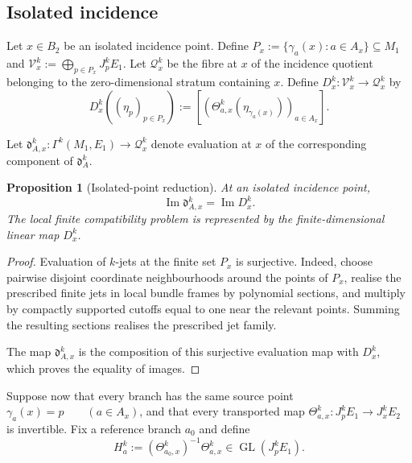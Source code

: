 \documentclass[11pt]{article}
\theoremstyle{plain}
\newtheorem{proposition}[theorem]{Proposition}
\theoremstyle{definition}
\begin{document}
\subsection{Isolated incidence}
\label{subsec:isolated-incidence}

Let \(x\in B_2\) be an isolated incidence point. Define \(P_x := \{\gamma_a(x):a\in A_x\} \subseteq M_1\) and
\(\mathcal V_x^k := \bigoplus_{p\in P_x}J_p^kE_1\).
Let \(\mathcal Q_x^k\) be the fibre at \(x\) of the incidence quotient belonging to the
zero-dimensional stratum containing \(x\). Define \(D_x^k: \mathcal V_x^k \longrightarrow \mathcal Q_x^k\) by
\[
  D_x^k
  \left(
    (\eta_p)_{p\in P_x}
  \right)
  :=
  \left[
    \left(
      \Theta_{a,x}^k
      \left(
        \eta_{\gamma_a(x)}
      \right)
    \right)_{a\in A_x}
  \right].
\]

Let \(\mathfrak d_{A,x}^k: \Gamma^k(M_1,E_1) \longrightarrow \mathcal Q_x^k\) denote evaluation at \(x\) of the corresponding component of
\(\mathfrak d_A^k\).

\begin{proposition}[Isolated-point reduction]
\label{prop:isolated-point-reduction}
At an isolated incidence point,
\[
  \operatorname{Im}\mathfrak d_{A,x}^k
  =
  \operatorname{Im}D_x^k.
\]
The local finite compatibility problem is represented by the
finite-dimensional linear map \(D_x^k\).
\end{proposition}

\begin{proof}
Evaluation of \(k\)-jets at the finite set \(P_x\) is surjective.
Indeed, choose pairwise disjoint coordinate neighbourhoods around the
points of \(P_x\), realise the prescribed finite jets in local bundle
frames by polynomial sections, and multiply by compactly supported
cutoffs equal to one near the relevant points. Summing the resulting
sections realises the prescribed jet family.

The map \(\mathfrak d_{A,x}^k\) is the composition of this surjective
evaluation map with \(D_x^k\), which proves the equality of images.
\end{proof}

Suppose now that every branch has the same source point
\(\gamma_a(x)=p \qquad (a\in A_x)\),
and that every transported map \(\Theta_{a,x}^k: J_p^kE_1 \longrightarrow J_x^kE_2\) is invertible. Fix a reference branch \(a_0\) and define
\[
  H_a^k
  :=
  \left(
    \Theta_{a_0,x}^k
  \right)^{-1}
  \Theta_{a,x}^k
  \in
  \operatorname{GL}(J_p^kE_1).
\]
\end{document}
